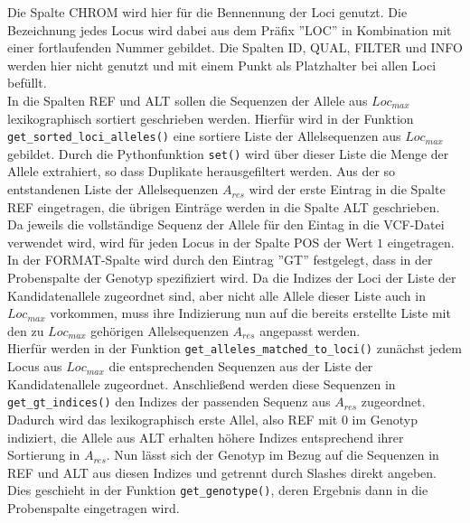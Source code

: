Die Spalte CHROM wird hier für die Bennennung der Loci genutzt. Die Bezeichnung jedes Locus wird dabei aus dem Präfix ''LOC'' in Kombination mit einer fortlaufenden Nummer gebildet. Die Spalten ID, QUAL, FILTER und INFO werden hier nicht genutzt und mit einem Punkt als Platzhalter bei allen Loci befüllt.\\

In die Spalten REF und ALT sollen die Sequenzen der Allele aus $Loc_{max}$ lexikographisch sortiert geschrieben werden. Hierfür wird in der Funktion \lstinline|get_sorted_loci_alleles()| eine sortiere Liste der Allelsequenzen aus $Loc_{max}$ gebildet. Durch die Pythonfunktion \lstinline|set()| wird über dieser Liste die Menge der Allele extrahiert, so dass Duplikate herausgefiltert werden. Aus der so entstandenen Liste der Allelsequenzen $A_{res}$ wird der erste Eintrag in die Spalte REF eingetragen, die übrigen Einträge werden in die Spalte ALT geschrieben.\\

Da jeweils die vollständige Sequenz der Allele für den Eintag in die VCF-Datei verwendet wird, wird für jeden Locus in der Spalte POS der Wert $1$ eingetragen. \\

In der FORMAT-Spalte wird durch den Eintrag ''GT'' festgelegt, dass in der Probenspalte der Genotyp spezifiziert wird. Da die Indizes der Loci der Liste der Kandidatenallele zugeordnet sind, aber nicht alle Allele dieser Liste auch in $Loc_{max}$ vorkommen, muss ihre Indizierung nun auf die bereits erstellte Liste mit den zu $Loc_{max}$ gehörigen Allelsequenzen $A_{res}$ angepasst werden. \\

Hierfür werden in der Funktion \lstinline|get_alleles_matched_to_loci()| zunächst jedem Locus aus $Loc_{max}$ die entsprechenden Sequenzen aus der Liste der Kandidatenallele zugeordnet. Anschließend werden diese Sequenzen in \lstinline|get_gt_indices()| den Indizes der passenden Sequenz aus $A_{res}$ zugeordnet. Dadurch wird das lexikographisch erste Allel, also REF mit 0 im Genotyp indiziert, die Allele aus ALT erhalten höhere Indizes entsprechend ihrer Sortierung in $A_{res}$. Nun lässt sich der Genotyp im Bezug auf die Sequenzen in REF und ALT aus diesen Indizes und getrennt durch Slashes direkt angeben. Dies geschieht in der Funktion \lstinline|get_genotype()|, deren Ergebnis dann in die Probenspalte eingetragen wird.\\


